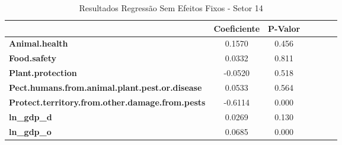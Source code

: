 \begin{table}[ht]
    \begin{center}
        \begin{tabular}{lcccccc}
            & \textbf{Coeficiente} & \textbf{P-Valor} \\
            \midrule
\textbf{Animal.health}                                    &       0.1570  &         0.456  \\
\textbf{Food.safety}                                      &       0.0332  &         0.811  \\
\textbf{Plant.protection}                                 &      -0.0520  &         0.518  \\
\textbf{Pect.humans.from.animal.plant.pest.or.disease}    &       0.0533  &         0.564  \\
\textbf{Protect.territory.from.other.damage.from.pests}   &      -0.6114  &         0.000  \\
\textbf{ln\_gdp\_d}                                       &       0.0269  &         0.130  \\
\textbf{ln\_gdp\_o}                                       &       0.0685  &         0.000  \\
\bottomrule
\end{tabular}
\caption{Resultados Regressão Sem Efeitos Fixos - Setor 14}
\end{center}
\end{table}